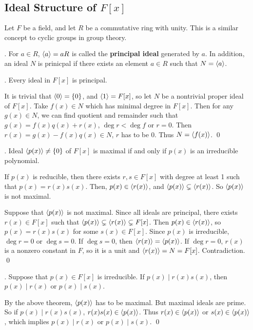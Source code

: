 \subsection*{Ideal Structure of \(F[x]\)}

Let \(F\) be a field, and let \(R\) be a commutative ring with unity. This is a similar concept to cyclic groups in group theory.

.  For \(a \in R\), \(\left\langle a \right\rangle = aR\) is called the \textbf{principal ideal} generated by \(a\). In addition, an ideal \(N\) is prinicpal if there exists an element \(a \in R\) such that \(N = \left\langle a \right\rangle\).

\thm. Every ideal in \(F[x]\) is principal.

\pf It is trivial that \(\left\langle 0 \right\rangle = \{0\}\), and \(\left\langle 1 \right\rangle = F[x]\), so let \(N\) be a nontrivial proper ideal of \(F[x]\). Take \(f(x) \in N\) which has minimal degree in \(F[x]\). Then for any \(g(x) \in N\), we can find quotient and remainder such that \(g(x) = f(x)q(x) + r(x)\), \(\deg r < \deg f\) or \(r = 0\). Then \(r(x) = g(x) - f(x)q(x) \in N\), \(r\) has to be \(0\). Thus \(N = \left\langle f(x) \right\rangle\). \qed

\thm. Ideal \(\left\langle p(x) \right\rangle \neq \{0\}\) of \(F[x]\) is maximal if and only if \(p(x)\) is an irreducible polynomial.

\pf \note{\mimp} If \(p(x)\) is reducible, then there exists \(r, s \in F[x]\) with degree at least 1 such that \(p(x) = r(x)s(x)\). Then, \(p(x) \in \left\langle r(x) \right\rangle\), and \(\left\langle p(x) \right\rangle \subsetneq \left\langle r(x) \right\rangle\). So \(\left\langle p(x) \right\rangle\) is not maximal.

\note{\mimpd} Suppose that \(\left\langle p(x) \right\rangle\) is not maximal. Since all ideals are principal, there exists \(r(x) \in F[x]\) such that \(\left\langle p(x) \right\rangle \subsetneq \left\langle r(x) \right\rangle \subsetneq F[x]\). Then \(p(x) \in \left\langle r(x) \right\rangle\), so \(p(x) = r(x)s(x)\) for some \(s(x) \in F[x]\). Since \(p(x)\) is irreducible, \(\deg r = 0\) or \(\deg s = 0\). If \(\deg s = 0\), then \(\left\langle r(x) \right\rangle = \left\langle p(x) \right\rangle\). If \(\deg r = 0\), \(r(x)\) is a nonzero constant in \(F\), so it is a unit and \(\left\langle r(x) \right\rangle = N = F[x]\). Contradiction. \qed

\thm. Suppose that \(p(x) \in F[x]\) is irreducible. If \(p(x) \mid r(x)s(x)\), then \(p(x) \mid r(x)\) or \(p(x) \mid s(x)\).

\pf By the above theorem, \(\left\langle p(x) \right\rangle\) has to be maximal. But maximal ideals are prime. So if \(p(x) \mid r(x)s(x)\), \(r(x)s(x) \in \left\langle p(x) \right\rangle\). Thus \(r(x) \in \left\langle p(x) \right\rangle\) or \(s(x) \in \left\langle p(x) \right\rangle\), which implies \(p(x) \mid r(x)\) or \(p(x) \mid s(x)\). \qed

